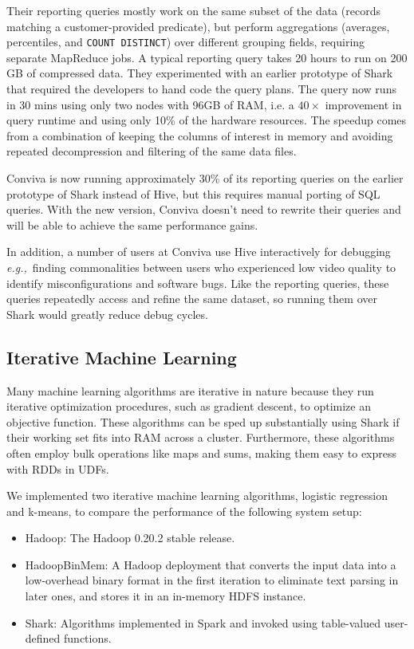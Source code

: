\documentclass[preprint]{acm_proc_article-sp}
\newcommand{\eg}{{\em e.g.,}~}
\newcommand{\HadoopBM}{HadoopBinMem\xspace}
\begin{document}
Their reporting queries mostly work on the same subset of the data (records matching a customer-provided predicate), but perform aggregations (averages, percentiles, and {\small\tt COUNT DISTINCT}) over different grouping fields, requiring separate MapReduce jobs. A typical reporting query takes 20 hours to run on 200 GB of compressed data. They experimented with an earlier prototype of Shark that required the developers to hand code the query plans. The query now runs in 30 mins using only two nodes with 96GB of RAM, i.e. a $40\times$ improvement in query runtime and using only 10\% of the hardware resources. The speedup comes from a combination of keeping the columns of interest in memory and avoiding repeated decompression and filtering of the same data files.

Conviva is now running approximately 30\% of its reporting queries on the earlier prototype of Shark instead of Hive, but this requires manual porting of SQL queries. With the new version, Conviva doesn't need to rewrite their queries and will be able to achieve the same performance gains.

In addition, a number of users at Conviva use Hive interactively for debugging \eg finding commonalities between users who experienced low video quality to identify misconfigurations and software bugs. Like the reporting queries, these queries repeatedly access and refine the same dataset, so running them over Shark would greatly reduce debug cycles.


\subsection{Iterative Machine Learning}

Many machine learning algorithms are iterative in nature because they run iterative optimization procedures, such as gradient descent, to optimize an objective function. These algorithms can be sped up substantially using Shark if their working set fits into RAM across a cluster. Furthermore, these algorithms often employ bulk operations like maps and sums, making them easy to express with RDDs in UDFs.

We implemented two iterative machine learning algorithms, logistic
regression and k-means, to compare the performance of the
following system setup:\vspace{-10pt}\begin{itemize}
  \setlength{\itemsep}{4pt}
  \setlength{\parskip}{0pt}
  \setlength{\parsep}{0pt}
  \item Hadoop: The Hadoop 0.20.2 stable release.
  \item \HadoopBM: A Hadoop deployment that converts the input
  data into a low-overhead binary format in the first iteration to eliminate
  text parsing in later ones, and stores it in an in-memory HDFS instance.
  \item Shark: Algorithms implemented in Spark and invoked using table-valued user-defined functions.
\end{itemize}
\end{document}
